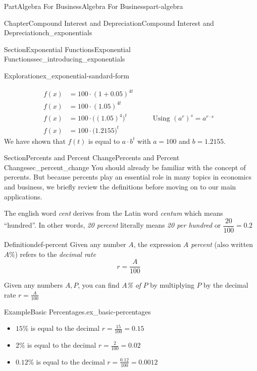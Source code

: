 \documentclass{tufte-book}
\numberwithin{equation}{chapter}
\newcommand{\amp}{&}
\begin{document}
\begin{partptx}{Part}{Algebra For Business}{}{Algebra For Business}{}{}{part-algebra}
\begin{chapterptx}{Chapter}{Compound Interest and Depreciation}{}{Compound Interest and Depreciation}{}{}{ch_exponentials}
\begin{sectionptx}{Section}{Exponential Functions}{}{Exponential Functions}{}{}{sec_introducing_exponentials}
\begin{exploration}{Exploration}{}{ex_exponential-sandard-form}
\begin{enumerate}[font=\bfseries,label=(\alph*),ref=\alph*]
\begin{align*}
f(x) \amp =  100 \cdot \left(1 + 0.05\right)^{4t} \qquad\amp \\
f(x) \amp =  100 \cdot \left(1.05\right)^{4t} \qquad\amp \\
f(x) \amp =  100 \cdot \Big(\left(1.05\right)^{4}\Big)^t \qquad\amp \text{Using }{\left(a^{r}\right)}^s=  a^{r\cdot s}\\
f(x) \amp =  100 \cdot \Big(1.2155\Big)^t \qquad\amp 
\end{align*}
We have shown that \(f(t)\) is equal to \(a\cdot b^t\) with \(a=100\) and \(b=1.2155\).%
\end{enumerate}%
\end{exploration}%
\end{sectionptx}
%
%
\typeout{************************************************}
\typeout{************************************************}
%
\begin{sectionptx}{Section}{Percents and Percent Change}{}{Percents and Percent Change}{}{}{sec_percent_change}
You should already be familiar with the concept of percents. But because percents play an essential role in many  topics in economics and business, we briefly review the definitions before moving on to our main applications.%
\par
The english word \emph{cent} derives from the Latin word \emph{centum} which means ``hundred''. In other words, \emph{20 percent} literally means \emph{20 per hundred} or \(\dfrac{20}{100} = 0.2\)%
\begin{definition}{Definition}{}{def-percent}%
Given any number \(A\), the expression \emph{\(A\) percent} (also written \(A\)\%) refers to the \emph{decimal rate}%
\begin{equation*}
r = \dfrac{A}{100}
\end{equation*}
%
\par
Given any numbers \(A,P\), you can find \emph{\(A\)\% of \(P\)} by multiplying \(P\) by the decimal rate \(r = \frac{A}{100}\)%
\end{definition}
\begin{example}{Example}{Basic Percentages.}{ex_basic-percentages}%
%
\begin{itemize}[label=\textbullet]
\item{}\(15\)\% is equal to the decimal \(r = \frac{15}{100} = 0.15\)%
\item{}\(2\)\% is equal to the decimal \(r = \frac{2}{100} = 0.02\)%
\item{}\(0.12\)\% is equal to the decimal \(r = \frac{0.12}{100} = 0.0012\)%

\end{itemize}
\end{example}
\end{sectionptx}
\end{chapterptx}
\end{partptx}
\end{document}
